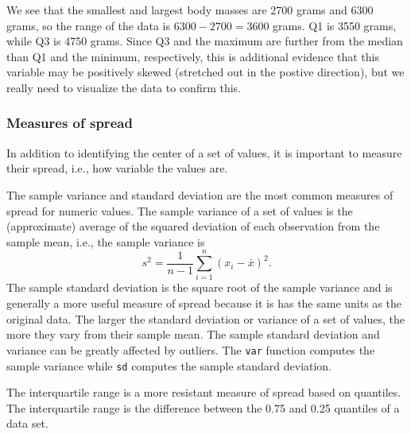 \documentclass[
]{book}
\newenvironment{Shaded}{\begin{snugshade}}{\end{snugshade}}
\newcommand{\AttributeTok}[1]{\textcolor[rgb]{0.77,0.63,0.00}{#1}}
\newcommand{\ConstantTok}[1]{\textcolor[rgb]{0.00,0.00,0.00}{#1}}
\newcommand{\DecValTok}[1]{\textcolor[rgb]{0.00,0.00,0.81}{#1}}
\newcommand{\DocumentationTok}[1]{\textcolor[rgb]{0.56,0.35,0.01}{\textbf{\textit{#1}}}}
\newcommand{\FloatTok}[1]{\textcolor[rgb]{0.00,0.00,0.81}{#1}}
\newcommand{\FunctionTok}[1]{\textcolor[rgb]{0.00,0.00,0.00}{#1}}
\newcommand{\NormalTok}[1]{#1}
\newcommand{\SpecialCharTok}[1]{\textcolor[rgb]{0.00,0.00,0.00}{#1}}
\theoremstyle{definition}
\theoremstyle{definition}
\theoremstyle{definition}
\theoremstyle{definition}
\theoremstyle{remark}
\begin{document}
\begin{Shaded}
\end{Shaded}

We see that the smallest and largest body masses are 2700 grams and 6300 grams, so the range of the data is \(6300 - 2700 = 3600\) grams. Q1 is 3550 grams, while Q3 is 4750 grams. Since Q3 and the maximum are further from the median than Q1 and the minimum, respectively, this is additional evidence that this variable may be positively skewed (stretched out in the postive direction), but we really need to visualize the data to confirm this.

\hypertarget{measures-of-spread}{%
\subsubsection{Measures of spread}\label{measures-of-spread}}

In addition to identifying the center of a set of values, it is important to measure their spread, i.e., how variable the values are.

The sample variance and standard deviation are the most common measures of spread for numeric values. The sample variance of a set of values is the (approximate) average of the squared deviation of each observation from the sample mean, i.e., the sample variance is \[s^2 = \frac{1}{n-1}\sum_{i=1}^n (x_i - \bar{x})^2.\] The sample standard deviation is the square root of the sample variance and is generally a more useful measure of spread because it is has the same units as the original data. The larger the standard deviation or variance of a set of values, the more they vary from their sample mean. The sample standard deviation and variance can be greatly affected by outliers. The \texttt{var} function computes the sample variance while \texttt{sd} computes the sample standard deviation.

The interquartile range is a more resistant measure of spread based on quantiles. The interquartile range is the difference between the 0.75 and 0.25 quantiles of a data set.
\end{document}
